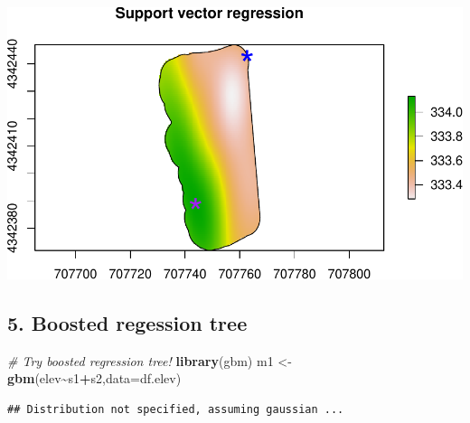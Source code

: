 \documentclass[
]{book}
\newenvironment{Shaded}{\begin{snugshade}}{\end{snugshade}}
\newcommand{\AttributeTok}[1]{\textcolor[rgb]{0.13,0.29,0.53}{#1}}
\newcommand{\CommentTok}[1]{\textcolor[rgb]{0.56,0.35,0.01}{\textit{#1}}}
\newcommand{\FunctionTok}[1]{\textcolor[rgb]{0.13,0.29,0.53}{\textbf{#1}}}
\newcommand{\NormalTok}[1]{#1}
\newcommand{\OtherTok}[1]{\textcolor[rgb]{0.56,0.35,0.01}{#1}}
\newcommand{\SpecialCharTok}[1]{\textcolor[rgb]{0.81,0.36,0.00}{\textbf{#1}}}
\begin{document}
\includegraphics{_main_files/figure-latex/unnamed-chunk-21-1.pdf}

\hypertarget{boosted-regession-tree}{%
\subsection{5. Boosted regession tree}\label{boosted-regession-tree}}

\begin{Shaded}
\begin{Highlighting}[]
\CommentTok{\# Try boosted regression tree!}
\FunctionTok{library}\NormalTok{(gbm)}
\NormalTok{m1 }\OtherTok{\textless{}{-}} \FunctionTok{gbm}\NormalTok{(elev}\SpecialCharTok{\textasciitilde{}}\NormalTok{s1}\SpecialCharTok{+}\NormalTok{s2,}\AttributeTok{data=}\NormalTok{df.elev)}
\end{Highlighting}
\end{Shaded}

\begin{verbatim}
## Distribution not specified, assuming gaussian ...
\end{verbatim}
\end{document}
